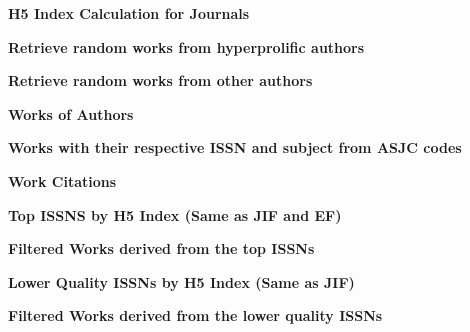\textbf{H5 Index Calculation for Journals}





\textbf{Retrieve random works from hyperprolific authors}



\textbf{Retrieve random works from other authors}



\textbf{Works of Authors}





\textbf{Works with their respective ISSN and subject from ASJC codes}





\textbf{Work Citations}





\textbf{Top ISSNS by H5 Index (Same as JIF and EF)}



\textbf{Filtered Works derived from the top ISSNs}





\textbf{Lower Quality ISSNs by H5 Index (Same as JIF)}



\textbf{Filtered Works derived from the lower quality ISSNs}





